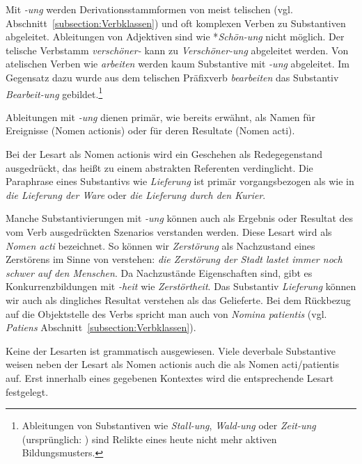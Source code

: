 \label{subsubsection:ung}

Mit \textit{-ung} werden Derivationsstammformen von meist telischen (vgl. Abschnitt~\ref{subsection:Verbklassen}) und oft komplexen Verben zu Substantiven abgeleitet. Ableitungen von Adjektiven sind wie *\textit{Schön-ung} nicht möglich. Der telische Verbstamm \textit{verschöner-} kann zu \textit{Verschöner-ung} abgeleitet werden. Von atelischen Verben wie \textit{arbeiten} werden kaum Substantive mit \textit{-ung} abgeleitet. Im Gegensatz dazu wurde aus dem telischen Präfixverb \textit{bearbeiten} das Substantiv \textit{Bearbeit-ung} gebildet.\footnote{Ableitungen von Substantiven wie \textit{Stall-ung}, \textit{Wald-ung} oder \textit{Zeit-ung} (ursprünglich: ) sind Relikte eines heute nicht mehr aktiven Bildungsmusters.}

Ableitungen mit \textit{-ung} dienen primär, wie bereits erwähnt, als Namen für Ereignisse (Nomen actionis) oder für deren Resultate (Nomen acti). 

Bei der Lesart als Nomen actionis wird ein Geschehen als Redegegenstand ausgedrückt, das heißt zu einem abstrakten Referenten verdinglicht. Die Paraphrase eines Substantivs wie \textit{Lieferung} ist primär vorgangsbezogen als  wie in \textit{die Lieferung der Ware} oder \textit{die Lieferung durch den Kurier}. 

Manche Substantivierungen mit \textit{-ung} können auch als Ergebnis oder Resultat des vom Verb ausgedrückten Szenarios verstanden werden. Diese Lesart wird als \textit{Nomen acti} bezeichnet. So können wir \textit{Zerstörung} als Nachzustand eines Zerstörens im Sinne von  verstehen: \textit{die Zerstörung der Stadt lastet immer noch schwer auf den Menschen}. Da Nachzustände Eigenschaften sind, gibt es Konkurrenzbildungen mit \textit{-heit} wie \textit{Zerstörtheit}. Das Substantiv \textit{Lieferung} können wir auch als dingliches Resultat verstehen als das Gelieferte. Bei dem Rückbezug auf die Objektstelle des Verbs spricht man auch von \textit{Nomina patientis} (vgl. \textit{Patiens} Abschnitt~\ref{subsection:Verbklassen}). 

Keine der Lesarten ist grammatisch ausgewiesen. Viele deverbale Substantive weisen neben der Lesart als Nomen actionis auch die als Nomen acti/patientis auf. Erst innerhalb eines gegebenen Kontextes wird die entsprechende Lesart festgelegt. 


